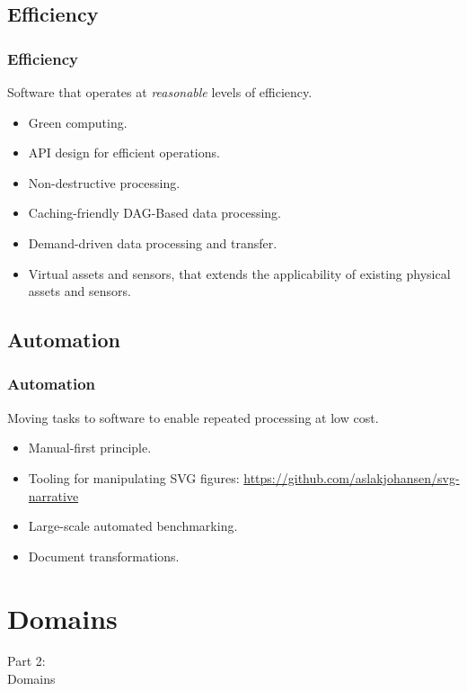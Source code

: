 \subsection{Efficiency}
\begin{frame}
    \frametitle{Efficiency}
    \vspace{3mm}
    Software that operates at \textsl{reasonable} levels of efficiency.
    \vspace{5mm}
    \begin{itemize}
        \item Green computing.
        \item API design for efficient operations.
        \item Non-destructive processing.
        \item Caching-friendly DAG-Based data processing.
        \item Demand-driven data processing and transfer.
        \item Virtual assets and sensors, that extends the applicability of existing physical assets and sensors.
    \end{itemize}
\end{frame}

\subsection{Automation}
\begin{frame}
    \frametitle{Automation}
    \vspace{3mm}
    Moving tasks to software to enable repeated processing at low cost.
    \vspace{5mm}
    \begin{itemize}
        \item Manual-first principle.
        \item Tooling for manipulating SVG figures:
          \url{https://github.com/aslakjohansen/svg-narrative}
        \item Large-scale automated benchmarking.
        \item Document transformations.
    \end{itemize}
\end{frame}

\section{Domains}
\begin{frame}
    \vspace{25mm}
    \begin{center}
        \Huge{Part 2:\\Domains}
    \end{center}
\end{frame}

